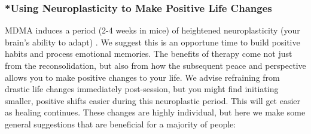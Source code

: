 \documentclass[12pt,letterpaper]{article}
\begin{document}
\subsubsection{*Using Neuroplasticity to Make Positive Life Changes}
MDMA induces a period (2-4 weeks in mice) of heightened neuroplasticity (your brain's ability to adapt) \cite{nardouMDMAPlasticity}.  We suggest this is an opportune time to build positive habits and process emotional memories. The benefits of therapy come not just from the reconsolidation, but also from how the subsequent peace and perspective allows you to make positive changes to your life. We advise refraining from drastic life changes immediately post-session, but you might find initiating smaller, positive shifts easier during this neuroplastic period. This will get easier as healing continues. These changes are highly individual, but here we make some general suggestions that are beneficial for a majority of people: 
\end{document}
